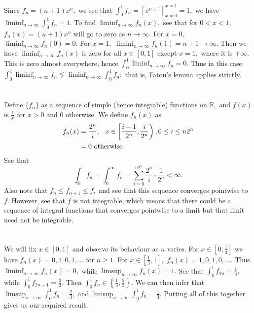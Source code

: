 \documentclass[]{article}
\begin{document}
	\section{} %
	Since $f_n=(n+1)x^n,$ we see that $\int_{0}^{1}f_n=[x^{n+1}]_{x=0}^{x=1}=1, $ we have $\liminf_{n \to \infty} \int_{0}^{1}f_n=1.$ To find $\liminf_{n \to \infty} f_n(x),$ see that for $0 < x <1,$ 
	$f_n(x)=(n+1)x^n$ will go to zero as $n \to \infty.$ For $x=0,$ $\liminf_{n \to \infty}f_n(0)=0.$ For $x=1,$ $\liminf_{n \to \infty}f_n(1)=n+1 \to \infty.$ Then we have $\liminf_{n \to \infty} f_n(x)$ is zero for all $x \in [0,1]$ except $x=1,$ where it is $+\infty.$
This is zero almost everywhere, hence $\int_{0}^{1}\liminf_{n \to \infty}f_n=0.$ Thus in this case $\int_{0}^{1}\liminf_{n \to \infty}f_n \lneq \liminf_{n \to \infty} \int_{0}^{1}f_n;$ that is, Fatou's lemma applies strictly.
	\section{} %
	Define $\{f_n\}$ as a sequence of simple (hence integrable) functions on $\mathbb{R},$ and $f(x)$ is $\frac{1}{x}$ for $x>0$ and $0$ otherwise. 
	We define $f_n(x)$ as 
	\begin{align*}
		f_n(x)&= \frac{2^n}{i}, \hspace{0.1 in} x \in \left[ \frac{i-1 }{2^n}, \frac{i }{2^n} \right), 0 \leq i \leq n2^n \\
		&= 0 \text{ otherwise.} 
	\end{align*} 
See that $$\int_{\mathbb{R}}f_n=\int_{0}^{\infty}f_n= \sum_{i=0}^{n2^n}\frac{2^n}{i}\cdot \frac{1}{2^n} < \infty.$$
Also note that $f_n \leq f_{n+1} \leq f,$ and see that this sequence converges pointwise to $f.$ However, see that $f$ is not integrable, which means that there could be a sequence of integral functions that converges pointwise to a limit but that limit need not be integrable.
	\section{} %
	We will fix $x \in [0,1]$ and observe its behaviour as $n$ varies. For $x \in \left[0,\frac{1}{3}\right]$ we have $f_n(x)= 0,1,0,1, \dots$ for $n \geq 1.$ For $x \in \left[ \frac{1}{3},1 \right],$ $f_n(x)=1,0,1,0,\dots.$ 
	Thus $\liminf_{n \to \infty}f_n(x)=0,$ while $ \limsup_{n \to \infty} f_n(x)=1.$ See that $\int_{0}^{1}f_{2n}=\frac{1}{3},$ while $\int_{0}^{1}f_{2n+1}=\frac{2}{3}.$ Then $\int_{0}^{1}f_{n} \in \left\{ \frac{1}{3}, \frac{2}{3}\right\}.$ We can then infer that $\limsup_{n \to \infty}\int_{0}^{1}f_{n} =\frac{2}{3},$ and   $\limsup_{n \to \infty}\int_{0}^{1}f_{n} =\frac{1}{3}.$ Putting all of this together gives us our required result. 
\end{document}
